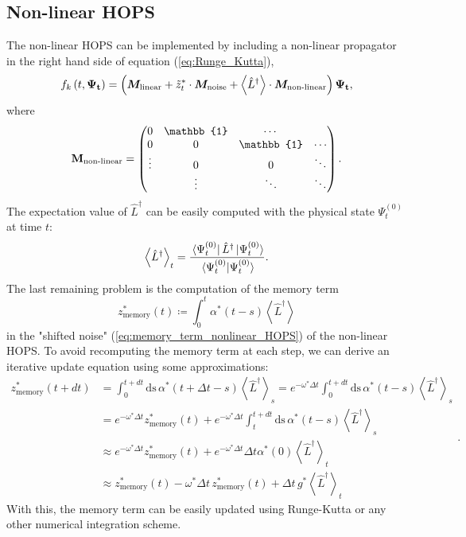 \subsection*{Non-linear HOPS}
The non-linear HOPS can be implemented by including a non-linear propagator in the right hand side of equation (\ref{eq:Runge_Kutta}),
\begin{equation}
    f_k\left(t, \vb{\Psi_t}\right) = \left(\vb*{M_\text{linear}} + \tilde{z}_t^* \cdot \vb*{M_\text{noise}} + \left\langle \hat{L}^\dagger\right\rangle \cdot \vb*{M_\text{non-linear}}\right) \vb{\Psi_t},
\end{equation}
where
\begin{equation*}
    \vb{M_\text{non-linear}} = 
    \begin{pmatrix}
        0      & \mathbb{1} & \cdots     &        \\
        0      & 0          & \mathbb{1} & \cdots \\
        \vdots & 0          & 0          & \ddots \\
               & \vdots & \ddots & \ddots \\
    \end{pmatrix}.
\end{equation*}
The expectation value of $\hat{L}^\dagger$ can be easily computed with the physical state $\Psi_t^{(0)}$ at time $t$:
\begin{equation}
    \left\langle \hat{L}^\dagger \right\rangle_t = \frac{\bra*{\Psi^{(0)}_t}\hat{L}^\dagger\ket*{\Psi^{(0)}_t}}{\bra*{\Psi^{(0)}_t}\ket*{\Psi^{(0)}_t}}.
\end{equation}
The last remaining problem is the computation of the memory term
\begin{equation*}
    z^*_{\text{memory}} (t) \coloneqq \int_0^t \alpha^*(t-s) \left\langle
        \hat{L}^\dagger
        \right\rangle
\end{equation*}
in the "shifted noise" (\ref{eq:memory_term_nonlinear_HOPS}) of the non-linear HOPS. To avoid recomputing the memory term
at each step, we can derive an iterative update equation using some approximations:
\begin{equation}
    \label{eq:memory_update_single_bath_node}
    \begin{split}
        z^*_\text{memory}(t+dt) &= \int_0^{t+dt}\text{ds}\,\alpha^*(t+\Delta t-s)\left\langle \hat{L}^{\dagger}\right\rangle_s = e^{-\omega^*\Delta t} \int_0^{t+dt}\text{ds}\,\alpha^*(t-s)\left\langle \hat{L}^{\dagger}\right\rangle_s \\
        &= e^{-\omega^*\Delta t} z^*_\text{memory}(t) + e^{-\omega^*\Delta t} \int_t^{t+dt}\text{ds}\,\alpha^*(t-s)\left\langle \hat{L}^{\dagger}\right\rangle_s \\
        &\approx e^{-\omega^*\Delta t} z^*_\text{memory}(t) + e^{-\omega^*\Delta t} \Delta t \alpha^*(0) \left\langle \hat{L}^{\dagger}\right\rangle_t \\
        &\approx z^*_\text{memory}(t) - \omega^*\Delta t \, z^*_\text{memory}(t) + \Delta t \, g^* \left\langle \hat{L}^{\dagger}\right\rangle_t
    \end{split}.
\end{equation}
With this, the memory term can be easily updated using Runge-Kutta or any other numerical integration scheme. 